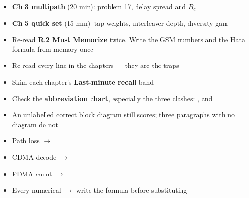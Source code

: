 {\begin{itemize}
        convolutional encode $+$ Viterbi decode
  \item[$\square$] \textbf{Ch 3 multipath} (20 min): problem 17, delay spread and $B_c$
  \item[$\square$] \textbf{Ch 5 quick set} (15 min): tap weights, interleaver depth,
        diversity gain
\end{itemize}
\begin{itemize}
  \item[$\square$] Re-read \textbf{R.2 Must Memorize} twice. Write the GSM numbers and the
        Hata formula from memory once
  \item[$\square$] Re-read every  line in the chapters --- they are the traps
  \item[$\square$] Skim each chapter's \textbf{Last-minute recall} band
  \item[$\square$] Check the \textbf{abbreviation chart}, especially the three clashes:
        ,  and 
\end{itemize}
\begin{itemize}
  \item[$\square$]  An unlabelled correct block diagram still
        scores; three paragraphs with no diagram do not
  \item[$\square$] Path loss $\rightarrow$ 
  \item[$\square$] CDMA decode $\rightarrow$ 
  \item[$\square$] FDMA count $\rightarrow$ 
  \item[$\square$] Every numerical $\rightarrow$ write the formula before substituting
\end{itemize}}
